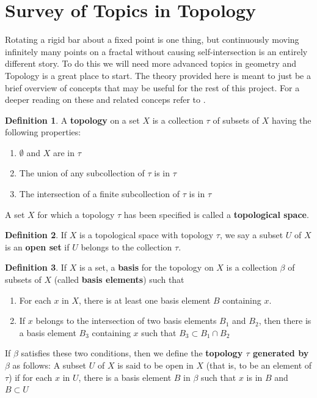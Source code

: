 \documentclass{article}
\theoremstyle{definition}
\newtheorem{definition}{Definition}[section]
\begin{document}
\section{Survey of Topics in Topology}
Rotating a rigid bar about a fixed point is one thing, but continuously moving infinitely many points on a fractal without causing self-intersection is an entirely different story. To do this we will need more advanced topics in geometry and Topology is a great place to start. The theory provided here is meant to just be a brief overview of concepts that may be useful for the rest of this project. For a deeper reading on these and related conceps refer to \cite{munkres2000topology}.
\begin{definition}
    A \textbf{topology} on a set $X$ is a collection $\tau$ of subsets of $X$ having the following properties:
    \begin{enumerate}
        \item $\emptyset$ and $X$ are in $\tau$
        \item The union of any subcollection of $\tau$ is in $\tau$
        \item The intersection of a finite subcollection of $\tau$ is in $\tau$
    \end{enumerate}
    A set $X$ for which a topology $\tau$ has been specified is called a \textbf{topological space}.
\end{definition}
\begin{definition}
    If $X$ is a topological space with topology $\tau$, we say a subset $U$ of $X$ is an \textbf{open set} if $U$ belongs to the collection $\tau$.
\end{definition}
\begin{definition}
    If $X$ is a set, a \textbf{basis} for the topology on $X$ is a collection $\beta$ of subsets of $X$ (called \textbf{basis elements}) such that
    \begin{enumerate}
        \item For each $x$ in $X$, there is at least one basis element $B$ containing $x$.
        \item If $x$ belongs to the intersection of two basis elements $B_1$ and $B_2$, then there is a basis element $B_3$ containing $x$ such that $B_3 \subset B_1 \cap B_2$
    \end{enumerate}
    If $\beta$ satisfies these two conditions, then we define the \textbf{topology $\tau$ generated by $\beta$} as follows: A subset $U$ of $X$ is said to be open in $X$ (that is, to be an element of $\tau$) if for each $x$ in $U$, there is a basis element $B$ in $\beta$ such that $x$ is in $B$ and $B \subset U$
\end{definition}
\end{document}
